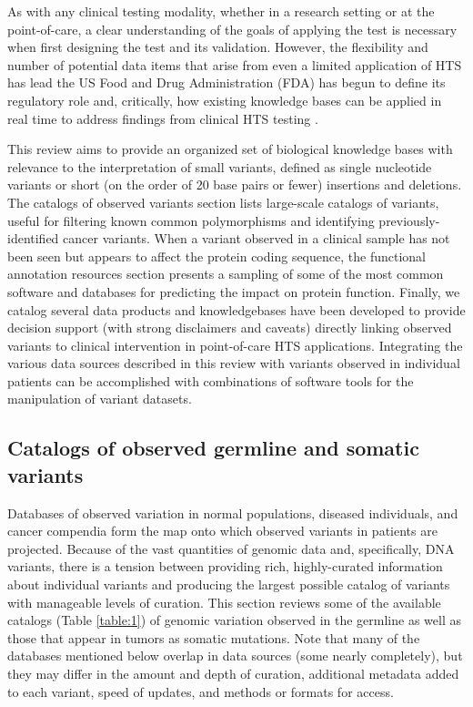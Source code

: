 \documentclass{article}
\begin{document}
As with any clinical testing modality, whether in a research setting
or at the point-of-care, a clear understanding of the goals of
applying the test is necessary when first designing the test and its
validation. However, the flexibility and number of potential data
items that arise from even a limited application of HTS has lead the
US Food and Drug Administration (FDA) has begun to define its
regulatory role \parencite{Fda2015-kv} and, critically, how existing
knowledge bases can be applied in real time to address findings from
clinical HTS testing \parencite{Fda2016-kx}.

This review aims to provide an organized set of biological knowledge
bases with relevance to the interpretation of small variants, defined
as single nucleotide variants or short (on the order of 20 base pairs
or fewer) insertions and deletions. The catalogs of observed variants
section lists large-scale catalogs of variants, useful for filtering
known common polymorphisms and identifying previously-identified
cancer variants. When a variant observed in a clinical sample has not
been seen but appears to affect the protein coding sequence, the
functional annotation resources section presents a sampling of some of
the most common software and databases for predicting the impact on
protein function. Finally, we catalog several data products and
knowledgebases have been developed to provide decision support (with
strong disclaimers and caveats) directly linking observed variants to
clinical intervention in point-of-care HTS applications. Integrating
the various data sources described in this review with variants
observed in individual patients can be accomplished with combinations
of software tools for the manipulation of variant datasets.

\subsection{Catalogs of observed germline and somatic variants}

Databases of observed variation in normal populations,
diseased individuals, and cancer compendia form the map onto which
observed variants in patients are projected. Because of the vast
quantities of genomic data and, specifically, DNA variants, there is a
tension between providing rich, highly-curated information about
individual variants and producing the largest possible catalog of
variants with manageable levels of curation. This section reviews some
of the available catalogs (Table \ref{table:1}) of genomic variation observed
in the germline as well as those that appear in tumors as somatic
mutations.  Note that many of the databases mentioned below overlap in
data sources (some nearly completely), but they may differ in the
amount and depth of curation, additional metadata added to each
variant, speed of updates, and methods or formats for access.
\end{document}
